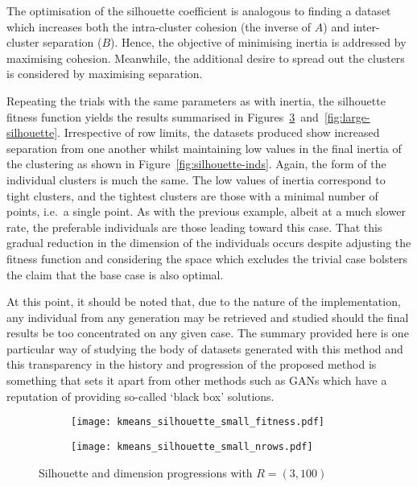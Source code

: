 The optimisation of the silhouette coefficient is analogous to finding a dataset
which increases both the intra-cluster cohesion (the inverse of \(A\)) and
inter-cluster separation (\(B\)). Hence, the objective of minimising inertia is
addressed by maximising cohesion. Meanwhile, the additional desire to spread out
the clusters is considered by maximising separation.

Repeating the trials with the same parameters as with inertia, the silhouette
fitness function yields the results summarised in
Figures~\ref{fig:small-silhouette}~and~\ref{fig:large-silhouette}. Irrespective
of row limits, the datasets produced show increased separation from one another
whilst maintaining low values in the final inertia of the clustering as shown in
Figure~\ref{fig:silhouette-inds}. Again, the form of the individual clusters is
much the same. The low values of inertia correspond to tight clusters, and the
tightest clusters are those with a minimal number of points, i.e.\ a single
point. As with the previous example, albeit at a much slower rate, the
preferable individuals are those leading toward this case. That this gradual
reduction in the dimension of the individuals occurs despite adjusting the
fitness function and considering the space which excludes the trivial case
bolsters the claim that the base case is also optimal.

At this point, it should be noted that, due to the nature of the implementation,
any individual from any generation may be retrieved and studied should the final
results be too concentrated on any given case. The summary provided here is one
particular way of studying the body of datasets generated with this method and
this transparency in the history and progression of the proposed method is
something that sets it apart from other methods such as GANs which have a
reputation of providing so-called `black box' solutions.

\begin{figure}[htbp]
    \centering
    \begin{subfigure}{\imgwidth}
        \texttt{[image: kmeans\_silhouette\_small\_fitness.pdf]}
        \label{fig:kmeans_silhouette_small_fitness}
    \end{subfigure}

    \begin{subfigure}{\imgwidth}
        \texttt{[image: kmeans\_silhouette\_small\_nrows.pdf]}
        \label{fig:kmeans_silhouette_small_nrows}
    \end{subfigure}
    \caption{%
        Silhouette and dimension progressions with \(R=(3, 100)\)
    }\label{fig:small-silhouette}
\end{figure}

